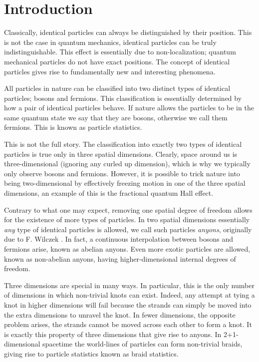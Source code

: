 
\chapter{Introduction}

Classically, identical particles can always be distinguished by their position. This is not the case in quantum mechanics, identical particles can be truly indistinguishable. This effect is essentially due to non-localization; quantum mechanical particles do not have exact positions. The concept of identical particles gives rise to fundamentally new and interesting phenomena.

All particles in nature can be classified into two distinct types of identical particles; bosons and fermions.
This classification is essentially determined by how a pair of identical particles behave. If nature allows the particles to be in the same quantum state we say that they are bosons, otherwise we call them fermions. This is known as particle statistics.

This is not the full story. The classification into exactly two types of identical particles is true only in three spatial dimensions. Clearly, space around us is three-dimensional (ignoring any curled up dimension), which is why we typically only observe bosons and fermions. However, it is possible to trick nature into being two-dimensional by effectively freezing motion in one of the three spatial dimensions, an example of this is the fractional quantum Hall effect.

Contrary to what one may expect, removing one spatial degree of freedom allows for the existence of more types of particles. In two spatial dimensions essentially \emph{any} type of identical particles is allowed, we call such particles \emph{anyons}, originally due to F. Wilczek \cite{wilczek}. In fact, a continuous interpolation between bosons and fermions arise, known as abelian anyons. Even more exotic particles are allowed, known as non-abelian anyons, having higher-dimensional internal degrees of freedom.

Three dimensions are special in many ways. In particular, this is the only number of dimensions in which non-trivial knots can exist. Indeed, any attempt at tying a knot in higher dimensions will fail because the strands can simply be moved into the extra dimensions to unravel the knot. In fewer dimensions, the opposite problem arises, the strands cannot be moved across each other to form a knot. It is exactly this property of three dimensions that give rise to anyons. In 2+1-dimensional spacetime the world-lines of particles can form non-trivial braids, giving rise to particle statistics known as braid statistics.

